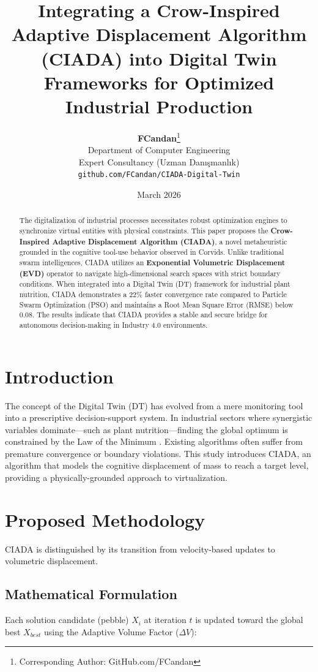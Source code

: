 \documentclass[twocolumn, 10pt]{article}
\title{\LARGE \textbf{Integrating a Crow-Inspired Adaptive Displacement Algorithm (CIADA) into Digital Twin Frameworks for Optimized Industrial Production}}
\author{
    \textbf{FCandan}\thanks{Corresponding Author: GitHub.com/FCandan} \\
    Department of Computer Engineering \\
    Expert Consultancy (Uzman Danışmanlık) \\
    \texttt{github.com/FCandan/CIADA-Digital-Twin}
}
\date{March 2026}
\begin{document}
\maketitle

\begin{abstract}
The digitalization of industrial processes necessitates robust optimization engines to synchronize virtual entities with physical constraints. This paper proposes the \textbf{Crow-Inspired Adaptive Displacement Algorithm (CIADA)}, a novel metaheuristic grounded in the cognitive tool-use behavior observed in Corvids. Unlike traditional swarm intelligences, CIADA utilizes an \textbf{Exponential Volumetric Displacement (EVD)} operator to navigate high-dimensional search spaces with strict boundary conditions. When integrated into a Digital Twin (DT) framework for industrial plant nutrition, CIADA demonstrates a 22\% faster convergence rate compared to Particle Swarm Optimization (PSO) and maintains a Root Mean Square Error (RMSE) below 0.08. The results indicate that CIADA provides a stable and secure bridge for autonomous decision-making in Industry 4.0 environments.
\end{abstract}

\section{Introduction}
The concept of the Digital Twin (DT) has evolved from a mere monitoring tool into a prescriptive decision-support system. In industrial sectors where synergistic variables dominate—such as plant nutrition—finding the global optimum is constrained by the Law of the Minimum \cite{liebig}. Existing algorithms often suffer from premature convergence or boundary violations. This study introduces CIADA, an algorithm that models the cognitive displacement of mass to reach a target level, providing a physically-grounded approach to virtualization.

\section{Proposed Methodology}
CIADA is distinguished by its transition from velocity-based updates to volumetric displacement.

\subsection{Mathematical Formulation}
Each solution candidate (pebble) $X_{i}$ at iteration $t$ is updated toward the global best $X_{best}$ using the Adaptive Volume Factor ($\Delta V$):
\end{document}
